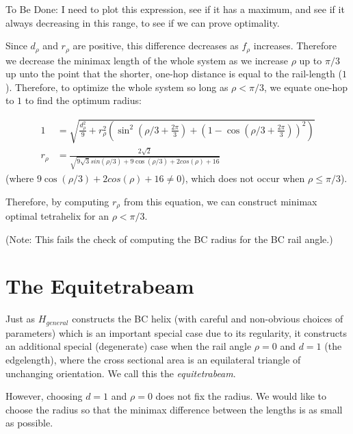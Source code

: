 \documentclass[11pt]{article}
\begin{document}
To Be Done: I need to plot this expression, see if it has a maximum, and see if it always decreasing in this range, to see if we can prove optimality.

Since $d_{\rho}$ and $r_{\rho}$ are positive, this difference decreases as $f_{\rho}$ increases. Therefore we decrease the minimax length
of the whole system as we increase $\rho$ up to $\pi/3$ up unto the point that the shorter, one-hop distance is equal to the rail-length ($1$).
Therefore, to optimize the whole system so long as $\rho < \pi/3$, we equate one-hop to $1$ to find the optimum radius:


\begin{align*}
  1 &= \sqrt{\frac{d_{\rho}^2}{9} + r_{\rho}^2(\sin^2(\rho/3 + \frac{2\pi}{3})  + (1 - \cos(\rho/3 + \frac{2\pi}{3}))^2)} \\
  r_{\rho} &= \frac{2 \sqrt{2} }{\sqrt{9 \sqrt{3} sin(\rho/3) + 9 \cos(\rho/3) + 2 cos(\rho)+ 16 }}
\end{align*}
(where $9 \cos(\rho/3) + 2 cos(\rho)+ 16  \neq 0$), which does not occur when $\rho \leq \pi/3$).

Therefore, by computing $r_{\rho}$ from this equation, we can construct minimax optimal tetrahelix for an $\rho < \pi/3$.

(Note: This fails the check of computing the BC radius for the BC rail angle.)



\section{The Equitetrabeam}

Just as $H_{general}$ constructs the BC helix (with careful and non-obvious choices of parameters) which is an important
special case due to its regularity, it constructs an additional special (degenerate) case when the rail angle $\rho = 0$
and $d = 1$ (the edgelength), where the cross sectional area is an equilateral triangle of unchanging orientation.
We call this the \emph{equitetrabeam}.

However, choosing $d = 1$ and $\rho = 0$ does not fix the radius. We would like to choose the radius so that the
minimax difference between the lengths is as small as possible.
\end{document}
